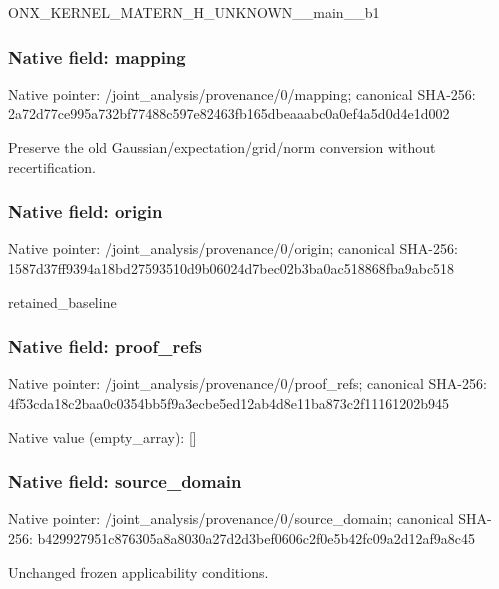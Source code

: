 \documentclass[10pt,a4paper]{article}
\begin{document}
\begingroup\raggedright\sloppy ONX\_\allowbreak{}KERNEL\_\allowbreak{}MATERN\_\allowbreak{}H\_\allowbreak{}UNKNOWN\_\allowbreak{}\_\allowbreak{}main\_\allowbreak{}\_\allowbreak{}b1\par\endgroup

\subsubsection{Native field: mapping}
Native pointer: /joint\_\allowbreak{}analysis/provenance/0/mapping; canonical SHA-256: 2a72d77ce995a732bf77488c597e82463fb165dbeaaabc0a0ef4a5d0d4e1d002

\begingroup\raggedright\sloppy Preserve the old Gaussian/\allowbreak{}expectation/\allowbreak{}grid/\allowbreak{}norm conversion without recertification.\par\endgroup

\subsubsection{Native field: origin}
Native pointer: /joint\_\allowbreak{}analysis/provenance/0/origin; canonical SHA-256: 1587d37ff9394a18bd27593510d9b06024d7bec02b3ba0ac518868fba9abc518

\begingroup\raggedright\sloppy retained\_\allowbreak{}baseline\par\endgroup

\subsubsection{Native field: proof\_\allowbreak{}refs}
Native pointer: /joint\_\allowbreak{}analysis/provenance/0/proof\_\allowbreak{}refs; canonical SHA-256: 4f53cda18c2baa0c0354bb5f9a3ecbe5ed12ab4d8e11ba873c2f11161202b945

Native value (empty\_\allowbreak{}array): []

\subsubsection{Native field: source\_\allowbreak{}domain}
Native pointer: /joint\_\allowbreak{}analysis/provenance/0/source\_\allowbreak{}domain; canonical SHA-256: b429927951c876305a8a8030a27d2d3bef0606c2f0e5b42fc09a2d12af9a8c45

\begingroup\raggedright\sloppy Unchanged frozen applicability conditions.\par\endgroup
\end{document}

